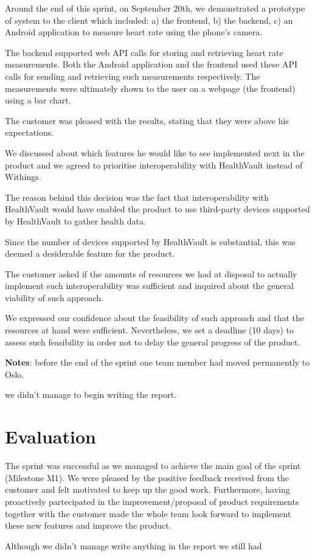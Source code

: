 Around the end of this sprint, on September 20th, we demonstrated a prototype of system to
the client which included: a) the frontend, b) the backend, c) an Android application to measure
heart rate using the phone's camera.

The backend supported web API calls for storing and retrieving heart rate measurements.
Both the Android application and the frontend used these API calls for sending and retrieving
such measurements respectively. The measurements were ultimately shown to the user on a
webpage (the frontend) using a bar chart.

The customer was pleased with the results, stating that they were above his expectations.

We discussed about which features he would like to see implemented next in the product
and we agreed to prioritise interoperability with HealthVault instead of Withings.

The reason behind this decision was the fact that interoperability with HealthVault would have
enabled the product to use third-party devices supported by HealthVault to gather health data.

Since the number of devices supported by HealthVault is substantial, this was deemed a
desiderable feature for the product.

The customer asked if the amounts of resources we had at disposal to actually implement
such interoperability was sufficient and inquired about the general viability of such approach.

We expressed our confidence about the feasibility of such approach and that the resources
at hand were sufficient. Nevertheless, we set a deadline (10 days) to assess such
feasibility in order not to delay the general progress of the product.

\textbf{Notes}: before the end of the sprint one team member had moved permanently to Oslo.

we didn't manage to begin writing the report.

\section{Evaluation}

The sprint was successful as we managed to achieve the main goal of the sprint (Milestone M1).
We were pleased by the positive feedback received from the customer and felt motivated to keep up the good work.
Furthermore, having proactively partecipated in the improvement/proposal of product requirements
together with the customer made the whole team look forward to implement these new features and improve the product.

Although we didn't manage write anything in the report we still had
